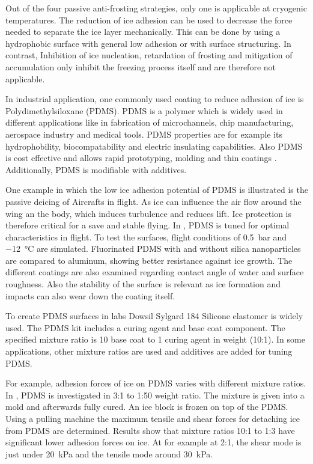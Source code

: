Out of the four passive anti-frosting strategies, only one is applicable at cryogenic temperatures. The reduction of ice adhesion can be used to decrease the force needed to separate the ice layer mechanically. This can be done by using a hydrophobic surface with general low adhesion or with surface structuring. In contrast, Inhibition of ice nucleation, retardation of frosting and mitigation of accumulation only inhibit the freezing process itself and are therefore not applicable.

In industrial application, one commonly used coating to reduce adhesion of ice is Polydimethylsiloxane (PDMS). PDMS is a polymer which is widely used in different applications like in fabrication of microchannels, chip manufacturing, aerospace industry and medical tools. PDMS properties are for example its hydrophobility, biocompatability and electric insulating capabilities. Also PDMS is cost effective and allows rapid prototyping, molding and thin coatings \cite{Wolf.2018}. Additionally, PDMS is modifiable with additives.

One example in which the low ice adhesion potential of PDMS is illustrated is the passive deicing of Aircrafts in flight. As ice can influence the air flow around the wing an the body, which induces turbulence and reduces lift. Ice protection is therefore critical for a save and stable flying. In \cite{Liu.2018}, PDMS is tuned for optimal characteristics in flight. To test the surfaces, flight conditions of \SI{0.5}{\bar} and \SI{-12}{\degreeCelsius} are simulated. Fluorinated PDMS with and without silica nanoparticles are compared to aluminum, showing better resistance against ice growth. The different coatings are also examined regarding contact angle of water and surface roughness. Also the stability of the surface is relevant as ice formation and impacts can also wear down the coating itself. 

To create PDMS surfaces in labs Dowsil Sylgard 184 Silicone elastomer is widely used\cite{DOW.}. The PDMS kit includes a curing agent and base coat component. The specified mixture ratio is 10 base coat to 1 curing agent in weight (10:1). In some applications, other mixture ratios are used and additives are added for tuning PDMS.

For example, adhesion forces of ice on PDMS varies with different mixture ratios. In \cite{IbanezIbanez.2022}, PDMS is investigated in 3:1 to 1:50 weight ratio. The mixture is given into a mold and afterwards fully cured. An ice block is frozen on top of the PDMS. Using a pulling machine the maximum tensile and shear forces for detaching ice from PDMS are determined. Results show that mixture ratios 10:1 to 1:3 have significant lower adhesion forces on ice. At for example at 2:1, the shear mode is just under \SI{20}{\kilo\pascal} and the tensile mode around \SI{30}{\kilo\pascal}. 

